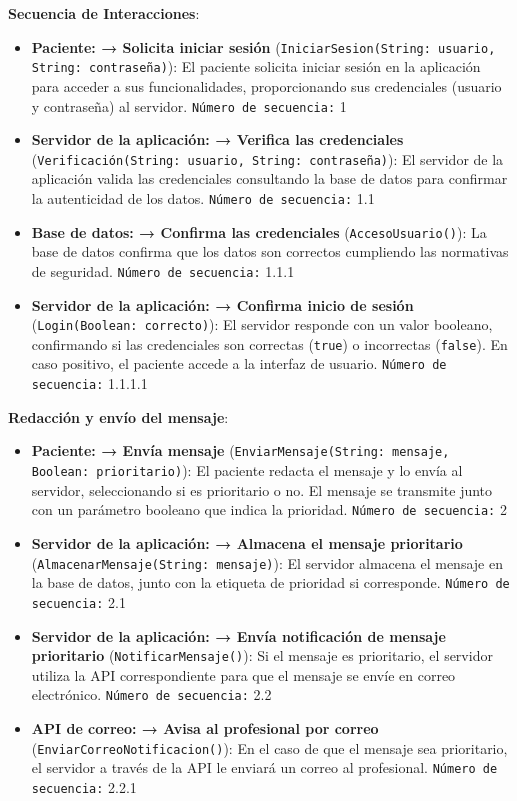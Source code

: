 \documentclass{article}
\begin{document}
\textbf{Secuencia de Interacciones}:
\begin{itemize}
	\item \textbf{Paciente: → Solicita iniciar sesión} (\texttt{IniciarSesion(String: usuario, String: contraseña)}): El paciente solicita iniciar sesión en la aplicación para acceder a sus funcionalidades, proporcionando sus credenciales (usuario y contraseña) al servidor. \texttt{Número de secuencia:} {1}
	\item \textbf{Servidor de la aplicación: → Verifica las credenciales} (\texttt{Verificación(String: usuario, String: contraseña)}): El servidor de la aplicación valida las credenciales consultando la base de datos para confirmar la autenticidad de los datos. \texttt{Número de secuencia:} {1.1}
	\item \textbf{Base de datos: → Confirma las credenciales} (\texttt{AccesoUsuario()}): La base de datos confirma que los datos son correctos cumpliendo las normativas de seguridad. \texttt{Número de secuencia:} {1.1.1}
	\item \textbf{Servidor de la aplicación: → Confirma inicio de sesión} (\texttt{Login(Boolean: correcto)}): El servidor responde con un valor booleano, confirmando si las credenciales son correctas (\texttt{true}) o incorrectas (\texttt{false}). En caso positivo, el paciente accede a la interfaz de usuario. \texttt{Número de secuencia:}  {1.1.1.1}
\end{itemize}

\textbf{Redacción y envío del mensaje}:
\begin{itemize}
	\item \textbf{Paciente: → Envía mensaje} (\texttt{EnviarMensaje(String: mensaje, Boolean: prioritario)}): El paciente redacta el mensaje y lo envía al servidor, seleccionando si es prioritario o no. El mensaje se transmite junto con un parámetro booleano que indica la prioridad. \texttt{Número de secuencia:} {2}
	\item \textbf{Servidor de la aplicación: → Almacena el mensaje prioritario} (\texttt{AlmacenarMensaje(String: mensaje)}): El servidor almacena el mensaje en la base de datos, junto con la etiqueta de prioridad si corresponde. \texttt{Número de secuencia:}  {2.1}
	\item \textbf{Servidor de la aplicación: → Envía notificación de mensaje prioritario} (\texttt{NotificarMensaje()}): Si el mensaje es prioritario, el servidor utiliza la API correspondiente para que el mensaje se envíe en correo electrónico. \texttt{Número de secuencia:}  {2.2}
	\item \textbf{API de correo: → Avisa al profesional por correo} (\texttt{EnviarCorreoNotificacion()}): En el caso de que el mensaje sea prioritario, el servidor a través de la API le enviará un correo al profesional. \texttt{Número de secuencia:}  {2.2.1}
\end{itemize}
\end{document}
